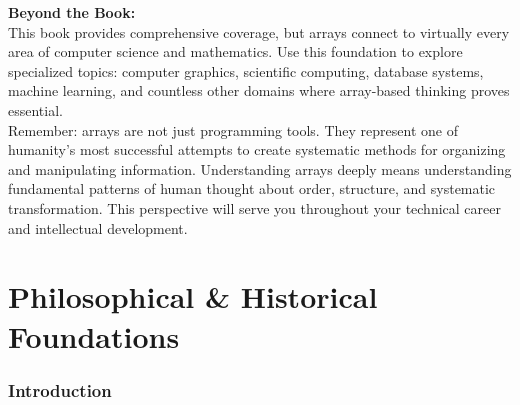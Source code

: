 \documentclass[12pt, oneside, openany]{book}
\begin{document}
\textbf{Beyond the Book:}\\
This book provides comprehensive coverage, but arrays connect to virtually every area of computer science and mathematics. Use this foundation to explore specialized topics: computer graphics, scientific computing, database systems, machine learning, and countless other domains where array-based thinking proves essential.\\
Remember: arrays are not just programming tools. They represent one of humanity's most successful attempts to create systematic methods for organizing and manipulating information. Understanding arrays deeply means understanding fundamental patterns of human thought about order, structure, and systematic transformation. This perspective will serve you throughout your technical career and intellectual development.

\part{Philosophical \& Historical Foundations}

\section*{Introduction}
\end{document}

